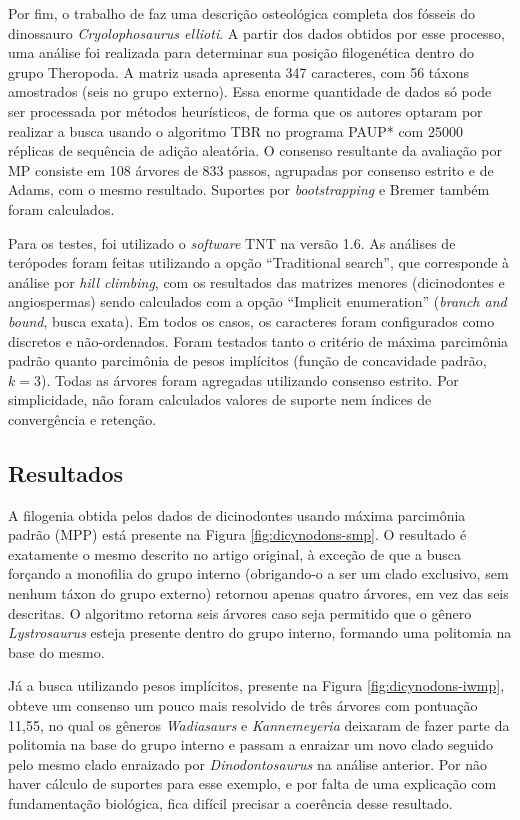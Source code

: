 \documentclass[12pt]{article}
\begin{document}
Por fim, o trabalho de \cite{cryolophosaurus} faz uma descrição osteológica completa dos fósseis do dinossauro \emph{Cryolophosaurus ellioti}. A partir dos dados obtidos por esse processo, uma análise foi realizada para determinar sua posição filogenética dentro do grupo Theropoda. A matriz usada apresenta 347 caracteres, com 56 táxons amostrados (seis no grupo externo). Essa enorme quantidade de dados só pode ser processada por métodos heurísticos, de forma que os autores optaram por realizar a busca usando o algoritmo TBR no programa PAUP* com 25000 réplicas de sequência de adição aleatória. O consenso resultante da avaliação por MP consiste em 108 árvores de 833 passos, agrupadas por consenso estrito e de Adams, com o mesmo resultado. Suportes por \emph{bootstrapping} e Bremer também foram calculados.

Para os testes, foi utilizado o \emph{software} TNT na versão 1.6. As análises de terópodes foram feitas utilizando a opção ``Traditional search'', que corresponde à análise por \emph{hill climbing}, com os resultados das matrizes menores (dicinodontes e angiospermas) sendo calculados com a opção ``Implicit enumeration'' (\emph{branch and bound}, busca exata). Em todos os casos, os caracteres foram configurados como discretos e não-ordenados. Foram testados tanto o critério de máxima parcimônia padrão quanto parcimônia de pesos implícitos (função de concavidade padrão, $k = 3$). Todas as árvores foram agregadas utilizando consenso estrito.
Por simplicidade, não foram calculados valores de suporte nem índices de convergência e retenção.

\subsection{Resultados}

A filogenia obtida pelos dados de dicinodontes usando máxima parcimônia padrão (MPP) está presente na Figura \ref{fig:dicynodons-smp}. O resultado é exatamente o mesmo descrito no artigo original, à exceção de que a busca forçando a monofilia do grupo interno (obrigando-o a ser um clado exclusivo, sem nenhum táxon do grupo externo) retornou apenas quatro árvores, em vez das seis descritas. O algoritmo retorna seis árvores caso seja permitido que o gênero \emph{Lystrosaurus} esteja presente dentro do grupo interno, formando uma politomia na base do mesmo.

Já a busca utilizando pesos implícitos, presente na Figura \ref{fig:dicynodons-iwmp}, obteve um consenso um pouco mais resolvido de três árvores com pontuação 11,55, no qual os gêneros \emph{Wadiasaurs} e \emph{Kannemeyeria} deixaram de fazer parte da politomia na base do grupo interno e passam a enraizar um novo clado seguido pelo mesmo clado enraizado por \emph{Dinodontosaurus} na análise anterior. Por não haver cálculo de suportes para esse exemplo, e por falta de uma explicação com fundamentação biológica, fica difícil precisar a coerência desse resultado.
\end{document}
